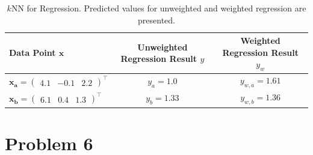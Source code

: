 \documentclass{scrartcl}
\begin{document}
\begin{table}[h]
	\centering

	\begin{tabular}{l|c|c}
	\hline

	\hline
	\textbf{Data Point} $\mathbf{x}$ & \textbf{Unweighted Regression Result} $y$ & \textbf{Weighted Regression Result} $y_w$\\
	\hline
		 $\mathbf{x_a} = \begin{pmatrix}
		 	4.1 & -0.1 & 2.2
		 \end{pmatrix}^\top$& $y_a = 1.0$ & $y_{w,a} = 1.61$\\
	\hline
		$\mathbf{x_b} = \begin{pmatrix}
			6.1 & 0.4 & 1.3
		\end{pmatrix}^\top$ & $y_b = 1.33$ & $y_{w,b} = 1.36$\\

	\hline
	\end{tabular}
	\caption{$k$NN for Regression. Predicted values for unweighted and weighted regression are presented.}
	\label{tab:class_predictions}
\end{table}

\section{Problem 6}


\end{document}
